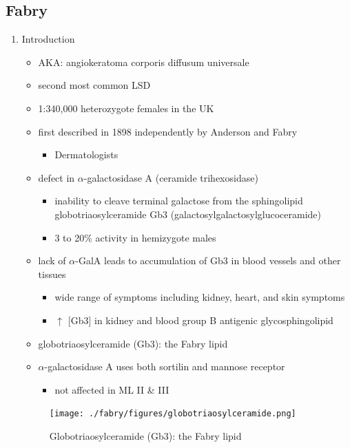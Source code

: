 \documentclass{scrartcl}
\begin{document}
\subsection{Fabry}
\label{sec:org94cac25}
\begin{enumerate}
\item Introduction
\label{sec:org0970c75}
\begin{itemize}
\item AKA: angiokeratoma corporis diffusum universale
\item second most common LSD
\item 1:340,000 heterozygote females in the UK
\item first described in 1898 independently by Anderson and Fabry
\begin{itemize}
\item Dermatologists
\end{itemize}
\item defect in \(\alpha\)-galactosidase A (ceramide trihexosidase)
\begin{itemize}
\item inability to cleave terminal galactose from the sphingolipid globotriaosylceramide Gb3 (galactosylgalactosylglucoceramide)
\item 3 to 20\% activity in hemizygote males
\end{itemize}
\item lack of \(\alpha\)-GalA leads to accumulation of Gb3 in blood vessels and other tissues
\begin{itemize}
\item wide range of symptoms including kidney, heart, and skin symptoms
\item \(\uparrow\) [Gb3] in kidney and blood group B antigenic glycosphingolipid
\end{itemize}
\item globotriaosylceramide (Gb3): the Fabry lipid
\item \(\alpha\)-galactosidase A uses both sortilin and mannose receptor
\begin{itemize}
\item not affected in ML II \& III
\end{itemize}
\end{itemize}

\begin{figure}[htbp]
\centering
\texttt{[image: ./fabry/figures/globotriaosylceramide.png]}
\caption[Globotriaosylceramide]{\label{fig:org3e152b8}
Globotriaosylceramide (Gb3): the Fabry lipid}
\end{figure}


\end{enumerate}
\end{document}

